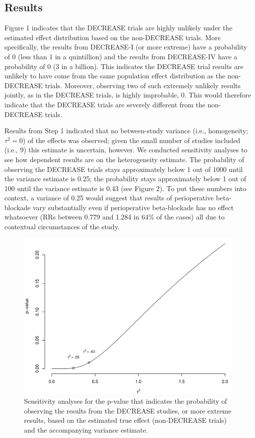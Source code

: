 \documentclass[]{article}
\begin{document}
\subsection{Results}\label{results-1}

Figure 1 indicates that the DECREASE trials are highly unlikely under
the estimated effect distribution based on the non-DECREASE trials. More
specifically, the results from DECREASE-I (or more extreme) have a
probability of \(0\) (less than 1 in a quintillion) and the results from
DECREASE-IV have a probability of \(0\) (3 in a billion). This indicates
the DECREASE trial results are unlikely to have come from the same
population effect distribution as the non-DECREASE trials. Moreover,
observing two of such extremely unlikely results jointly, as in the
DECREASE trials, is highly improbable, \(0\). This would therefore
indicate that the DECREASE trials are severely different from the
non-DECREASE trials.

Results from Step 1 indicated that no between-study variance (i.e.,
homogeneity; \(\tau^2=0\)) of the effects was observed; given the small
number of studies included (i.e., 9) this estimate is uncertain,
however. We conducted sensitivity analyses to see how dependent results
are on the heterogeneity estimate. The probability of observing the
DECREASE trials stays approximately below 1 out of 1000 until the
variance estimate is 0.25; the probability stays approximately below 1
out of 100 until the variance estimate is 0.43 (see Figure 2). To put
these numbers into context, a variance of 0.25 would suggest that
results of perioperative beta-blockade vary substantially even if
perioperative beta-blockade has no effect whatsoever (RRs between 0.779
and 1.284 in 64\% of the cases) all due to contextual circumstances of
the study.

\begin{figure}

{\centering \includegraphics[width=0.8\linewidth]{../figures/fig2} 

}

\caption{Sensitivity analyses for the p-value that indicates the probability of observing the results from the DECREASE studies, or more extreme results, based on the estimated true effect (non-DECREASE trials) and the accompanying variance estimate.}\label{fig:figure 2}
\end{figure}
\end{document}
